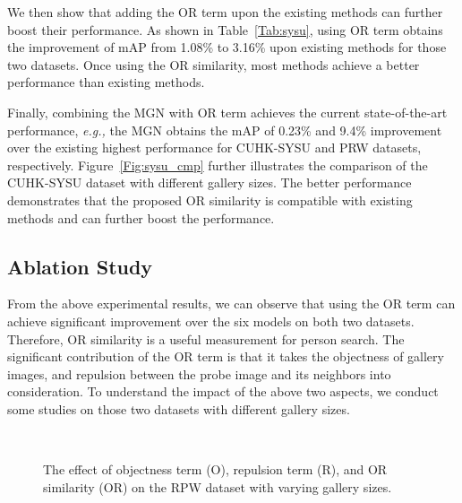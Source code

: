 \documentclass[journal]{IEEEtran}
\begin{document}
We then show that adding the OR term upon the existing methods can further boost their performance. 
As shown in Table~\ref{Tab:sysu}, using OR term obtains the improvement of mAP from 1.08\% to 3.16\% upon existing methods for those two datasets.
Once using the OR similarity, most methods achieve a better performance than existing methods.

Finally, combining the MGN with OR term achieves the current state-of-the-art performance, \emph{e.g.,}  the MGN obtains the mAP of 0.23\% and 9.4\% improvement over the existing highest performance for CUHK-SYSU and PRW datasets, respectively. 
Figure~\ref{Fig:sysu_cmp} further illustrates the comparison of the CUHK-SYSU dataset with different gallery sizes. 
The better performance demonstrates that the proposed OR similarity is compatible with existing methods and can further boost the performance. 


\subsection{Ablation Study}
From the above experimental results, we can observe that using the OR term can achieve significant improvement over the six models on both two datasets. 
Therefore, OR similarity is a useful measurement for person search. 
The significant contribution of the OR term is that it takes the objectness of gallery images, and repulsion between the probe image and its neighbors into consideration. 
To understand the impact of the above two aspects, we conduct some studies on those two datasets with different gallery sizes.

\begin{figure*}
\begin{center}
\\
\end{center}
\caption{The effect of objectness term (O), repulsion term (R), and OR similarity (OR) on the RPW dataset with varying gallery sizes.}
\label{Fig:PRWOr}
\end{figure*}
\end{document}
